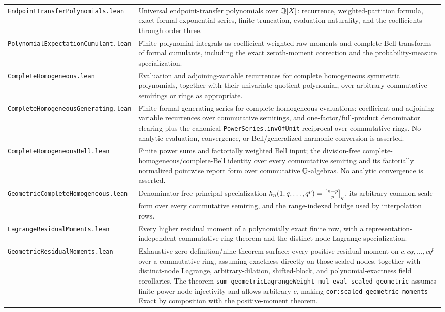 \documentclass[11pt,oneside]{article}
\theoremstyle{definition}
\theoremstyle{remark}
\begin{document}
\begin{longtable}{>{\raggedright\arraybackslash}p{} >{\raggedright\arraybackslash}p{}}
\nolinkurl{EndpointTransferPolynomials.lean} & Universal endpoint-transfer polynomials over \(\mathbb{Q}[X]\): recurrence, weighted-partition formula, exact formal exponential series, finite truncation, evaluation naturality, and the coefficients through order three. \\
\nolinkurl{PolynomialExpectationCumulant.lean} & Finite polynomial integrals as coefficient-weighted raw moments and complete Bell transforms of formal cumulants, including the exact zeroth-moment correction and the probability-measure specialization. \\
\nolinkurl{CompleteHomogeneous.lean} & Evaluation and adjoining-variable recurrences for complete homogeneous symmetric polynomials, together with their univariate quotient polynomial, over arbitrary commutative semirings or rings as appropriate. \\
\nolinkurl{CompleteHomogeneousGenerating.lean} & Finite formal generating series for complete homogeneous evaluations: coefficient and adjoining-variable recurrences over commutative semirings, and one-factor/full-product denominator clearing plus the canonical \nolinkurl{PowerSeries.invOfUnit} reciprocal over commutative rings.  No analytic evaluation, convergence, or Bell/generalized-harmonic conversion is asserted. \\
\nolinkurl{CompleteHomogeneousBell.lean} & Finite power sums and factorially weighted Bell input; the division-free complete-homogeneous/complete-Bell identity over every commutative semiring and its factorially normalized pointwise report form over commutative \(\mathbb{Q}\)-algebras.  No analytic convergence is asserted. \\
\nolinkurl{GeometricCompleteHomogeneous.lean} & Denominator-free principal specialization \(h_n(1,q,\ldots,q^p)=\GaussianBinomial{n+p}{p}{q}\), its arbitrary common-scale form over every commutative semiring, and the range-indexed bridge used by interpolation rows. \\
\nolinkurl{LagrangeResidualMoments.lean} & Every higher residual moment of a polynomially exact finite row, with a representation-independent commutative-ring theorem and the distinct-node Lagrange specialization. \\
\nolinkurl{GeometricResidualMoments.lean} & Exhaustive zero-definition/nine-theorem surface: every positive residual moment on \(c,cq,\ldots,cq^p\) over a commutative ring, assuming exactness directly on those scaled nodes, together with distinct-node Lagrange, arbitrary-dilation, shifted-block, and polynomial-exactness field corollaries.  The theorem \nolinkurl{sum_geometricLagrangeWeight_mul_eval_scaled_geometric} assumes finite power-node injectivity and allows arbitrary \(c\), making \nolinkurl{cor:scaled-geometric-moments} Exact by composition with the positive-moment theorem. \\

\end{longtable}
\end{document}
